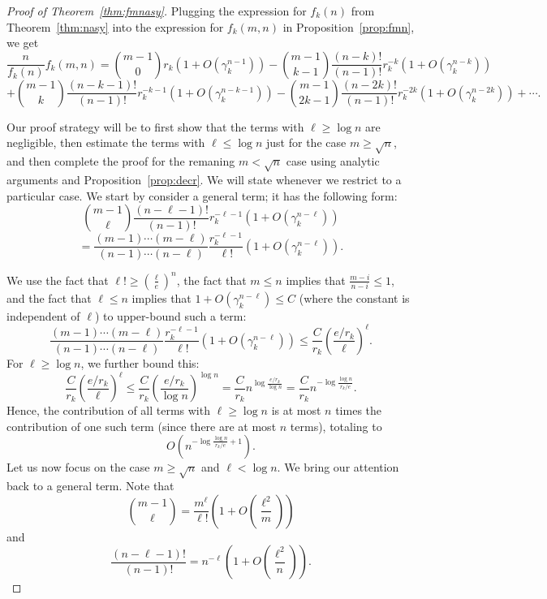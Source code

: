 \documentclass{amsart}
\theoremstyle{definition}
\begin{document}
\begin{proof}[Proof of Theorem~\ref{thm:fmnasy}]
Plugging the expression for $f_k(n)$ from Theorem~\ref{thm:nasy} into the expression for $f_k(m,n)$ in Proposition~\ref{prop:fmn}, we get
\[\frac{n}{f_k(n)}f_k(m,n)=\binom{m-1}{0}r_k\left(1+O(\gamma_k^{n-1})\right) -\binom{m-1}{k-1}\frac{(n-k)!}{(n-1)!}r_k^{-k}\left(1+O(\gamma_k^{n-k})\right)\]\[+\binom{m-1}{k}\frac{(n-k-1)!}{(n-1)!}r_k^{-k-1} \left(1+O(\gamma_k^{n-k-1})\right)-\binom{m-1}{2k-1}\frac{(n-2k)!}{(n-1)!}r_k^{-2k}\left(1+O(\gamma_k^{n-2k})\right)+\cdots.\]

Our proof strategy will be to first show that the terms with $\ell\geq \log{n}$ are negligible, then estimate the terms with $\ell\leq \log{n}$ just for the case $m\geq \sqrt{n}$, and then complete the proof for the remaning $m<\sqrt{n}$ case using analytic arguments and Proposition~\ref{prop:decr}. We will state whenever we restrict to a particular case. We start by consider a general term; it has the following form:
\[\binom{m-1}{\ell}\frac{(n-\ell-1)!}{(n-1)!}r_k^{-\ell-1}\left(1+O(\gamma_k^{n-\ell})\right)\]
\[=\frac{(m-1)\cdots(m-\ell)}{(n-1)\cdots(n-\ell)}\frac{r_k^{-\ell-1}}{\ell!}\left(1+O(\gamma_k^{n-\ell})\right).\]

We use the fact that $\ell!\geq \left(\frac{\ell}{e}\right)^n$, the fact that $m\leq n$ implies that $\frac{m-i}{n-i}\leq 1$, and the fact that $\ell\leq n$ implies that $1+O(\gamma_k^{n-\ell})\leq C$ (where the constant is independent of $\ell$) to upper-bound such a term:
\[\frac{(m-1)\cdots(m-\ell)}{(n-1)\cdots(n-\ell)}\frac{r_k^{-\ell-1}}{\ell!}\left(1+O(\gamma_k^{n-\ell})\right)\leq \frac{C}{r_k}\left(\frac{e/r_k}{\ell}\right)^{\ell}.\]
For $\ell\geq \log n$, we further bound this:
\[\frac{C}{r_k}\left(\frac{e/r_k}{\ell}\right)^{\ell}\leq\frac{C}{r_k}\left(\frac{e/r_k}{\log n}\right)^{\log n}=\frac{C}{r_k}n^{\log \frac{e/r_k}{\log n}}=\frac{C}{r_k}n^{-\log \frac{\log n}{r_k/e}}.\]
Hence, the contribution of all terms with $\ell\geq \log n$ is at most $n$ times the contribution of one such term (since there are at most $n$ terms), totaling to
\[O\left(n^{-\log \frac{\log n}{r_k/e}+1}\right).\]
Let us now focus on the case $m\geq \sqrt{n}$ and $\ell<\log n$. We bring our attention back to a general term. Note that
\[\binom{m-1}{\ell}=\frac{m^\ell}{\ell!}\left(1+O\left(\frac{\ell^2}{m}\right)\right)\]
and
\[\frac{(n-\ell-1)!}{(n-1)!}=n^{-\ell}\left(1+O\left(\frac{\ell^2}{n}\right)\right).\]


\end{proof}
\end{document}
